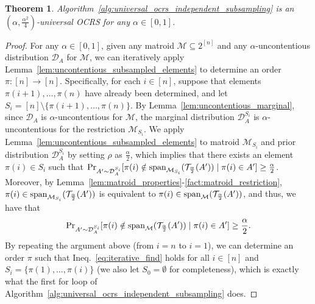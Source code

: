\documentclass[11pt]{article}
\newcommand{\D}{\mathcal D}
\newcommand{\M}{{\mathcal M}}
\newcommand{\T}{{\mathcal T}}
\newcommand{\spa}{\textnormal{span}}
\newtheorem{theorem}{Theorem}[section]
\begin{document}
\begin{theorem}\label{thm:universal_ocrs_independent_subsampling}
Algorithm~\ref{alg:universal_ocrs_independent_subsampling} is an $(\alpha,\frac{\alpha^2}{4})$-universal OCRS for any $\alpha\in[0,1]$.
\end{theorem}
\begin{proof}
For any $\alpha\in[0,1]$, given any matroid $\M\subseteq2^{[n]}$ and any $\alpha$-uncontentious distribution $\D_A$ for $\M$, we can iteratively apply Lemma~\ref{lem:uncontentious_subsampled_elements} to determine an order $\pi:[n]\to[n]$. Specifically, for each $i\in[n]$, suppose that elements $\pi(i+1),\dots,\pi(n)$ have already been determined, and let $S_i=[n]\setminus\{\pi(i+1),\dots,\pi(n)\}$. By Lemma~\ref{lem:uncontentious_marginal}, since $\D_A$ is $\alpha$-uncontentious for $\M$, the marginal distribution $\D_A^{S_i}$ is $\alpha$-uncontentious for the restriction $\M_{S_i}$. We apply Lemma~\ref{lem:uncontentious_subsampled_elements} to matroid $\M_{S_i}$ and prior distribution $\D_A^{S_i}$ by setting $\rho$ as $\frac{\alpha}{2}$, which implies that there exists an element $\pi(i)\in S_i$ such that ${\Pr}_{A'\sim \D_A^{S_i}}[\pi(i)\notin \spa_{\M_{S_i}}(\T_{\frac{\alpha}{2}}(A'))\mid \pi(i)\in A']\ge\frac{\alpha}{2}$. Moreover, by Lemma~\ref{lem:matroid_properties}-\ref{fact:matroid_restriction}, $\pi(i)\in \spa_{\M_{S_i}}(\T_{\frac{\alpha}{2}}(A'))$ is equivalent to $\pi(i)\in \spa_{\M}(\T_{\frac{\alpha}{2}}(A'))$, and thus, we have that
\begin{equation}\label{eq:iterative_find}
    {\Pr}_{A'\sim \D_A^{S_i}}[\pi(i)\notin \spa_{\M}(\T_{\frac{\alpha}{2}}(A'))\mid \pi(i)\in A']\ge\frac{\alpha}{2}.
\end{equation}
By repeating the argument above (from $i=n$ to $i=1$), we can determine an order $\pi$ such that Ineq.~\eqref{eq:iterative_find} holds for all $i\in [n]$ and $S_i=\{\pi(1),\dots,\pi(i)\}$ (we also let $S_0=\emptyset$ for completeness), which is exactly what the first for loop of Algorithm~\ref{alg:universal_ocrs_independent_subsampling} does.


\end{proof}
\end{document}
